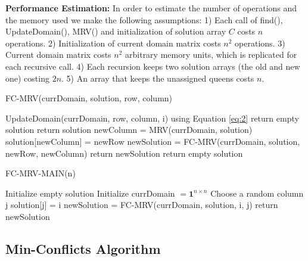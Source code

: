 \textbf{Performance Estimation:} In order to estimate the number of operations and the memory used we make the following assumptions: 1) Each call of find(), UpdateDomain(), MRV() and initialization of solution array $C$ costs $n$ operations. 2) Initialization of current domain matrix costs $n^2$ operations. 3) Current domain matrix costs $n^2$ arbitrary memory units, which is replicated for each recursive call. 4) Each recursion keeps two solution arrays (the old and new one) costing $2n$. 5) An array that keeps the unassigned queens costs $n$.

\begin{algorithm}
\caption{FC-MRV(currDomain, solution, row, column)}\label{alg:fc-mrv}
\begin{algorithmic}[1]
\State UpdateDomain(currDomain, row, column, i) using Equation \ref{eq:2}
return empty solution
\EndIf
\EndFor
{}
return solution
\EndIf
\State newColumn = MRV(currDomain, solution)
\State solution[newColumn] = newRow
\State newSolution = FC-MRV(currDomain, solution, newRow, newColumn) 
return newSolution
\EndIf
\EndFor
\State return empty solution
\end{algorithmic}
\end{algorithm}

\begin{algorithm}
\caption{FC-MRV-MAIN(n)}\label{alg:fc-mrv-main}
\begin{algorithmic}[1]
\State Initialize empty solution
\State Initialize currDomain $ = \boldsymbol{1}^{n\times n}$
\State Choose a random column j
\State solution[j] = i
\State newSolution = FC-MRV(currDomain, solution, i, j) 
return newSolution
\EndIf
\EndFor
\end{algorithmic}
\end{algorithm}


\subsection{Min-Conflicts Algorithm}


